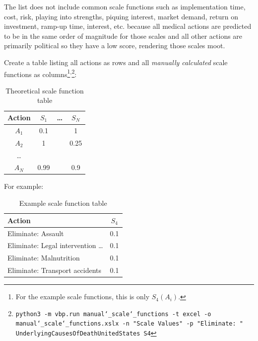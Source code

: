 \documentclass[12pt, a4paper, twocolumn]{article}
\begin{document}
The list does not include common scale functions such as implementation time, cost, risk, playing into strengths, piquing interest, market demand, return on investment, ramp-up time, interest, etc. because all medical actions are predicted to be in the same order of magnitude for those scales and all other actions are primarily political so they have a low score, rendering those scales moot.

Create a table listing all actions as rows and all \textit{manually calculated} scale functions as columns\footnote{For the example scale functions, this is only $S_4(A_i)$.}\textsuperscript{,}\footnote{\texttt{python3 -m vbp.run manual\char`_scale\char`_functions -t excel -o manual\char`_scale\char`_functions.xslx -n "Scale Values" -p "Eliminate: " UnderlyingCausesOfDeathUnitedStates S4}}:

\begin{table}[H]
  \centering
  \begin{tabular}{cccc}
    \toprule
      Action & $S_1$  & \ldots & $S_N$  \\
    \midrule
      $A_1$  & 0.1    &        & 1      \\
      $A_2$  & 1      &        & 0.25   \\
      \ldots &        &        &        \\
      $A_N$  & 0.99   &        & 0.9    \\
    \bottomrule
  \end{tabular}
  \caption{Theoretical scale function table}
  \label{table:scaletable}
\end{table}

For example:

\begin{table}[H]
  \centering
  \begin{tabular}{lc}
    \toprule
      Action                               & $S_4$ \\
    \midrule
      Eliminate: Assault                   & 0.1   \\
      Eliminate: Legal intervention \ldots & 0.1   \\
      Eliminate: Malnutrition              & 0.1   \\
      Eliminate: Transport accidents       & 0.1   \\
    \bottomrule
  \end{tabular}
  \caption{Example scale function table}
  \label{table:exscaletable}
\end{table}
\end{document}
